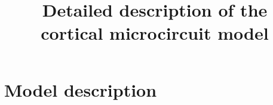 \documentclass[10pt,a4paper,twoside,american]{article}
\theoremstyle{definitionstyle}
\begin{document}
\title{Detailed description of the \\ cortical microcircuit model \citep{Potjans14}}
\author{}
\date{}
\maketitle
\thispagestyle{empty}

\def\marg{1ex}
\setlength{\parindent}{0pt}

\tableofcontents
\clearpage
\section{Model description}
\label{sec:model_description}
\end{document}
